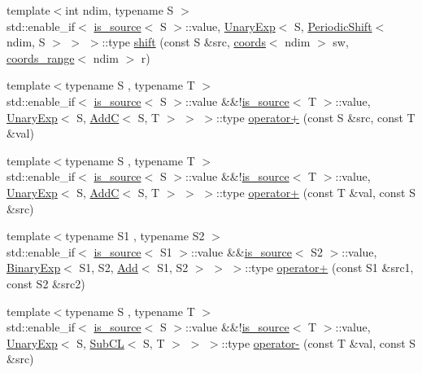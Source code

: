 \begin{DoxyCompactItemize}
\item 
{\footnotesize template$<$int ndim, typename S $>$ }\\std\+::enable\+\_\+if$<$ \hyperlink{classshark_1_1ndim_1_1is__source}{is\+\_\+source}$<$ S $>$\+::value, \hyperlink{classshark_1_1ndim_1_1_unary_exp}{Unary\+Exp}$<$ S, \hyperlink{classshark_1_1ndim_1_1_periodic_shift}{Periodic\+Shift}$<$ ndim, S $>$ $>$ $>$\+::type \hyperlink{namespaceshark_1_1ndim_afd5a6adf0ff010016f1513b83a0dd813}{shift} (const S \&src, \hyperlink{structshark_1_1ndim_1_1coords}{coords}$<$ ndim $>$ sw, \hyperlink{structshark_1_1ndim_1_1coords__range}{coords\+\_\+range}$<$ ndim $>$ r)
\item 
{\footnotesize template$<$typename S , typename T $>$ }\\std\+::enable\+\_\+if$<$ \hyperlink{classshark_1_1ndim_1_1is__source}{is\+\_\+source}$<$ S $>$\+::value \&\&!\hyperlink{classshark_1_1ndim_1_1is__source}{is\+\_\+source}$<$ T $>$\+::value, \hyperlink{classshark_1_1ndim_1_1_unary_exp}{Unary\+Exp}$<$ S, \hyperlink{classshark_1_1ndim_1_1_add_c}{AddC}$<$ S, T $>$ $>$ $>$\+::type \hyperlink{namespaceshark_1_1ndim_a63fa4086ee305e74456f6f5ec122f0e7}{operator+} (const S \&src, const T \&val)
\item 
{\footnotesize template$<$typename S , typename T $>$ }\\std\+::enable\+\_\+if$<$ \hyperlink{classshark_1_1ndim_1_1is__source}{is\+\_\+source}$<$ S $>$\+::value \&\&!\hyperlink{classshark_1_1ndim_1_1is__source}{is\+\_\+source}$<$ T $>$\+::value, \hyperlink{classshark_1_1ndim_1_1_unary_exp}{Unary\+Exp}$<$ S, \hyperlink{classshark_1_1ndim_1_1_add_c}{AddC}$<$ S, T $>$ $>$ $>$\+::type \hyperlink{namespaceshark_1_1ndim_ab911025a5c581955f4802f0f2a46b9b0}{operator+} (const T \&val, const S \&src)
\item 
{\footnotesize template$<$typename S1 , typename S2 $>$ }\\std\+::enable\+\_\+if$<$ \hyperlink{classshark_1_1ndim_1_1is__source}{is\+\_\+source}$<$ S1 $>$\+::value \&\&\hyperlink{classshark_1_1ndim_1_1is__source}{is\+\_\+source}$<$ S2 $>$\+::value, \hyperlink{classshark_1_1ndim_1_1_binary_exp}{Binary\+Exp}$<$ S1, S2, \hyperlink{classshark_1_1ndim_1_1_add}{Add}$<$ S1, S2 $>$ $>$ $>$\+::type \hyperlink{namespaceshark_1_1ndim_acc0eab01656face90121867d6c7ccca6}{operator+} (const S1 \&src1, const S2 \&src2)
\item 
{\footnotesize template$<$typename S , typename T $>$ }\\std\+::enable\+\_\+if$<$ \hyperlink{classshark_1_1ndim_1_1is__source}{is\+\_\+source}$<$ S $>$\+::value \&\&!\hyperlink{classshark_1_1ndim_1_1is__source}{is\+\_\+source}$<$ T $>$\+::value, \hyperlink{classshark_1_1ndim_1_1_unary_exp}{Unary\+Exp}$<$ S, \hyperlink{classshark_1_1ndim_1_1_sub_c_l}{Sub\+CL}$<$ S, T $>$ $>$ $>$\+::type \hyperlink{namespaceshark_1_1ndim_a4668c407586ccab4c63c2a234670ea9e}{operator-\/} (const T \&val, const S \&src)

\end{DoxyCompactItemize}
